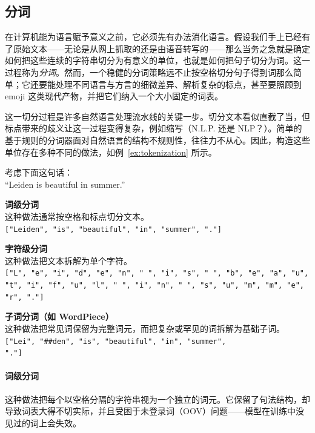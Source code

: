 \subsection{分词}
\label{sec:tokenization}
在计算机能为语言赋予意义之前，它必须先有办法消化语言。假设我们手上已经有了原始文本——无论是从网上抓取的还是由语音转写的——那么当务之急就是确定如何把这些连续的字符串切分为有意义的单位，也就是如何把句子切分为词。这一过程称为\emph{分词}。然而，一个稳健的分词策略远不止按空格切分句子得到词那么简单；它还要能处理不同语言与方言的细微差异、解析复杂的标点，甚至要照顾到 emoji 这类现代产物，并把它们纳入一个大小固定的词表。

这一切分过程是许多自然语言处理流水线的关键一步。切分文本看似直截了当，但标点带来的歧义让这一过程变得复杂，例如缩写（N.L.P. 还是 NLP？）。简单的基于规则的分词器面对自然语言的结构不规则性，往往力不从心。因此，构造这些单位存在多种不同的做法，如例~\ref{ex:tokenization} 所示。

\begin{example}[分词策略]\label{ex:tokenization}
考虑下面这句话：\\ ``Leiden is beautiful in summer.''

\vspace{0.3cm}
\noindent\textbf{词级分词} \\
这种做法通常按空格和标点切分文本。\\
\vspace{0.1cm}
\noindent\texttt{["Leiden", "is", "beautiful", "in", "summer", "."]}

\vspace{0.4cm}
\noindent\textbf{字符级分词} \\
这种做法把文本拆解为单个字符。\\
\vspace{0.1cm}
\noindent\texttt{["L", "e", "i", "d", "e", "n", " ", "i", "s", " ", "b", "e", "a", "u", "t", "i", "f", "u", "l", " ", "i", "n", " ", "s", "u", "m", "m", "e", "r", "."]}

\vspace{0.4cm}
\noindent\textbf{子词分词（如 WordPiece）} \\
这种做法把常见词保留为完整词元，而把复杂或罕见的词拆解为基础子词。\\
\vspace{0.1cm}
\noindent\texttt{["Lei", "\#\#den", "is", "beautiful", "in", "summer",}\\ 
\noindent\texttt{"."]}
\end{example}

\paragraph{词级分词}
这种做法把每个以空格分隔的字符串视为一个独立的词元。它保留了句法结构，却导致词表大得不切实际，并且受困于未登录词（OOV）问题——模型在训练中没见过的词上会失效。

